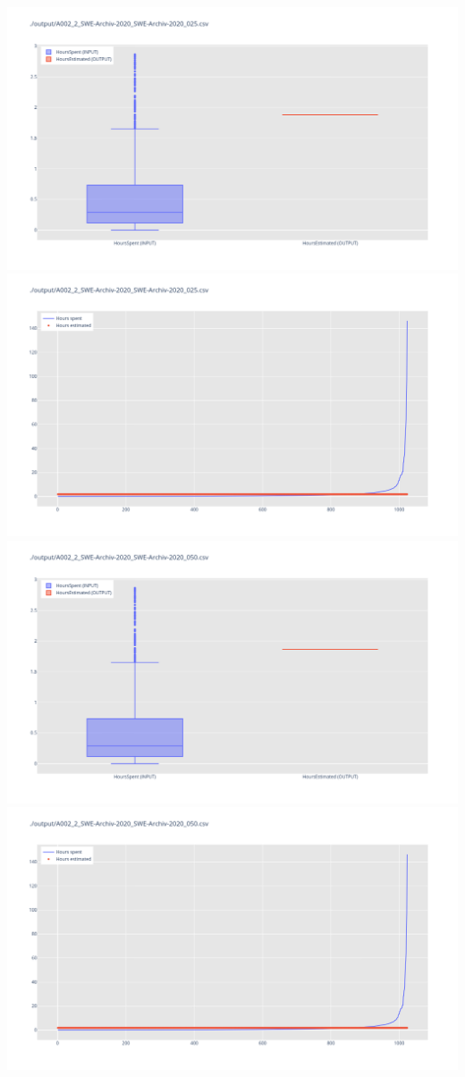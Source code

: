 \includegraphics[width=\textwidth]{Scripts/output/A002_2_SWE-Archiv-2020_SWE-Archiv-2020_025.csv.png}
\includegraphics[width=\textwidth]{Scripts/output/A002_2_SWE-Archiv-2020_SWE-Archiv-2020_025.csv.scatter.png}
\includegraphics[width=\textwidth]{Scripts/output/A002_2_SWE-Archiv-2020_SWE-Archiv-2020_050.csv.png}
\includegraphics[width=\textwidth]{Scripts/output/A002_2_SWE-Archiv-2020_SWE-Archiv-2020_050.csv.scatter.png}

